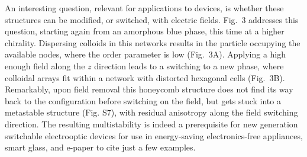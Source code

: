 \documentclass[12pt]{article}
\begin{document}
An interesting question, relevant for applications to devices, is whether 
these structures can be modified, or switched, with electric fields.
Fig.~3 addresses this question, starting again from an amorphous blue phase,
this time at a higher chirality. Dispersing colloids in this networks
results in the particle occupying the available nodes, where the order
parameter is low (Fig.~3A). Applying a high enough field along the $z$ 
direction leads to a switching to a new phase, where colloidal arrays fit 
within a network with distorted hexagonal cells (Fig.~3B). Remarkably, upon 
field removal this honeycomb structure does not find its way back to the 
configuration before switching on the field, but gets stuck into a metastable 
structure (Fig. S7), with residual anisotropy along the field switching 
direction.
The resulting multistability is indeed a prerequisite for new generation 
switchable electrooptic devices for use in energy-saving electronics-free
appliances, smart glass, and e-paper to cite just a few examples.

\fi
\end{document}
